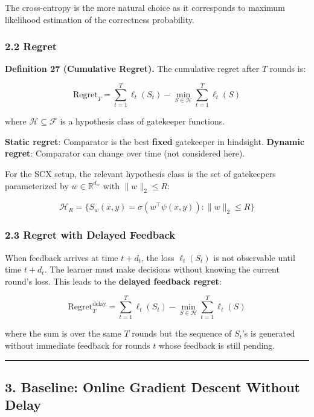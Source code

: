 \documentclass[
  12pt,
]{ctexart}
\begin{document}
The cross-entropy is the more natural choice as it corresponds to
maximum likelihood estimation of the correctness probability.

\subsubsection{2.2 Regret}\label{regret}

\textbf{Definition 27 (Cumulative Regret).} The cumulative regret after
\(T\) rounds is:

\[\text{Regret}_T = \sum_{t=1}^T \ell_t(S_t) - \min_{S \in \mathcal{H}} \sum_{t=1}^T \ell_t(S)\]

where \(\mathcal{H} \subseteq \mathcal{F}\) is a hypothesis class of
gatekeeper functions.

\textbf{Static regret}: Comparator is the best \textbf{fixed} gatekeeper
in hindsight. \textbf{Dynamic regret}: Comparator can change over time
(not considered here).

For the SCX setup, the relevant hypothesis class is the set of
gatekeepers parameterized by \(w \in \mathbb{R}^{d_w}\) with
\(\|w\|_2 \leq R\):

\[\mathcal{H}_R = \bigl\{ S_w(x,y) = \sigma(w^\top \psi(x,y)) : \|w\|_2 \leq R \bigr\}\]

\subsubsection{2.3 Regret with Delayed
Feedback}\label{regret-with-delayed-feedback}

When feedback arrives at time \(t + d_t\), the loss \(\ell_t(S_t)\) is
not observable until time \(t + d_t\). The learner must make decisions
without knowing the current round's loss. This leads to the
\textbf{delayed feedback regret}:

\[\text{Regret}_T^{\text{delay}} = \sum_{t=1}^T \ell_t(S_t) - \min_{S \in \mathcal{H}} \sum_{t=1}^T \ell_t(S)\]

where the sum is over the same \(T\) rounds but the sequence of
\(S_t\)'s is generated without immediate feedback for rounds \(t\) whose
feedback is still pending.

\begin{center}\rule{0.5\linewidth}{0.5pt}\end{center}

\subsection{3. Baseline: Online Gradient Descent Without
Delay}\label{baseline-online-gradient-descent-without-delay}
\end{document}

